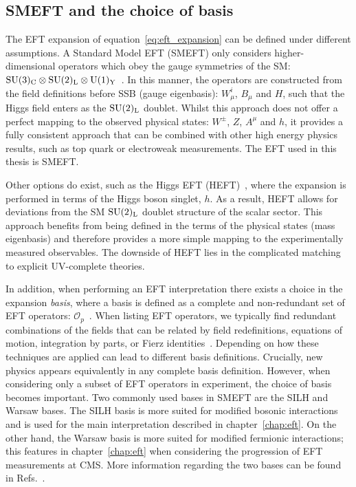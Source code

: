 \subsection{SMEFT and the choice of basis}
The EFT expansion of equation~\ref{eq:eft_expansion} can be defined under different assumptions. A Standard Model EFT (SMEFT) only considers higher-dimensional operators which obey the gauge symmetries of the SM: ${\rm{SU}}(3)_{\rm{C}} \otimes {\rm{SU}}(2)_{\rm{L}} \otimes {\rm{U}}(1)_{\rm{Y}}$~\cite{Brivio:2017vri}. In this manner, the operators are constructed from the field definitions before SSB (gauge eigenbasis): $W^i_\mu$, $B_\mu$ and $H$, such that the Higgs field enters as the ${\rm{SU}(2)_{\rm{L}}}$ doublet. Whilst this approach does not offer a perfect mapping to the observed physical states: $W^{\pm}$, $Z$, $A^\mu$ and $h$, it provides a fully consistent approach that can be combined with other high energy physics results, such as top quark or electroweak measurements. The EFT used in this thesis is SMEFT. 

Other options do exist, such as the Higgs EFT (HEFT)~\cite{Brivio:2017vri,deFlorian:2016spz}, where the expansion is performed in terms of the Higgs boson singlet, $h$. As a result, HEFT allows for deviations from the SM ${\rm{SU}(2)_{\rm{L}}}$ doublet structure of the scalar sector. This approach benefits from being defined in the terms of the physical states (mass eigenbasis) and therefore provides a more simple mapping to the experimentally measured observables. The downside of HEFT lies in the complicated matching to explicit UV-complete theories.

In addition, when performing an EFT interpretation there exists a choice in the expansion \textit{basis}, where a basis is defined as a complete and non-redundant set of EFT operators: $\mathcal{O}_p$~\cite{deFlorian:2016spz}. When listing EFT operators, we typically find redundant combinations of the fields that can be related by field redefinitions, equations of motion, integration by parts, or Fierz identities~\cite{Ellis:2018gqa}. Depending on how these techniques are applied can lead to different basis definitions. Crucially, new physics appears equivalently in any complete basis definition. However, when considering only a subset of EFT operators in experiment, the choice of basis becomes important. Two commonly used bases in SMEFT are the SILH and Warsaw bases. The SILH basis is more suited for modified bosonic interactions and is used for the main interpretation described in chapter~\ref{chap:eft}. On the other hand, the Warsaw basis is more suited for modified fermionic interactions; this features in chapter~\ref{chap:eft} when considering the progression of EFT measurements at CMS. More information regarding the two bases can be found in Refs.~\cite{Giudice:2007fh,Contino:2013kra,Grzadkowski2010}.

